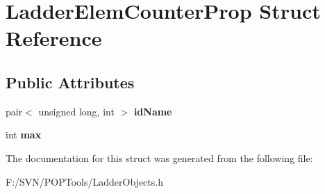 \hypertarget{struct_ladder_elem_counter_prop}{\section{Ladder\-Elem\-Counter\-Prop Struct Reference}
\label{struct_ladder_elem_counter_prop}
}
\subsection*{Public Attributes}
\begin{DoxyCompactItemize}
\item 
\hypertarget{struct_ladder_elem_counter_prop_a7452aa6c2cd012ccd39a96226c87cf8d}{pair$<$ unsigned long, int $>$ {\bfseries id\-Name}}\label{struct_ladder_elem_counter_prop_a7452aa6c2cd012ccd39a96226c87cf8d}

\item 
\hypertarget{struct_ladder_elem_counter_prop_aba0831f8b7153d1f2c316915c4694a4b}{int {\bfseries max}}\label{struct_ladder_elem_counter_prop_aba0831f8b7153d1f2c316915c4694a4b}

\end{DoxyCompactItemize}


The documentation for this struct was generated from the following file\-:\begin{DoxyCompactItemize}
\item 
F\-:/\-S\-V\-N/\-P\-O\-P\-Tools/Ladder\-Objects.\-h\end{DoxyCompactItemize}
